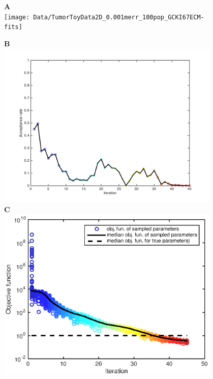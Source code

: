 \documentclass[10pt,letterpaper]{article}
\begin{document}
\begin{figure}[p]
\begin{adjustwidth}{-2in}{0in} %
\begin{center}
\textbf{A} \\ \texttt{[image: Data/TumorToyData2D\_0.001merr\_100pop\_GCKI67ECM-fits]} \\
\begin{minipage}[t]{0.45\textwidth}
	\textbf{B} \\ \includegraphics[width=0.95\textwidth]{Data/TumorToyData2D_0.001merr_100pop_GCKI67ECM_NEW_acceptanceRate}\\
	\textbf{C} \\ \includegraphics[width=0.95\textwidth]{Data/TumorToyData2D_0.001merr_100pop_GCKI67ECM-objFunc}

\end{minipage}
\end{center}
\end{adjustwidth}
\end{figure}
\end{document}
